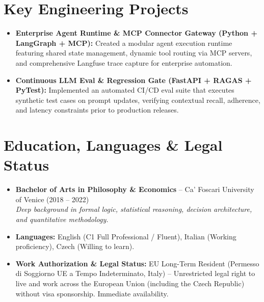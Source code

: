 \documentclass[a4paper,10pt]{article}
\begin{document}
\section{Key Engineering Projects}
\begin{itemize}
  \item \textbf{Enterprise Agent Runtime \& MCP Connector Gateway (Python + LangGraph + MCP):} Created a modular agent execution runtime featuring shared state management, dynamic tool routing via MCP servers, and comprehensive Langfuse trace capture for enterprise automation.
  \item \textbf{Continuous LLM Eval \& Regression Gate (FastAPI + RAGAS + PyTest):} Implemented an automated CI/CD eval suite that executes synthetic test cases on prompt updates, verifying contextual recall, adherence, and latency constraints prior to production releases.
\end{itemize}

\section{Education, Languages \& Legal Status}
\begin{itemize}
  \item \textbf{Bachelor of Arts in Philosophy \& Economics} -- Ca' Foscari University of Venice (2018 -- 2022) \\
  \textit{Deep background in formal logic, statistical reasoning, decision architecture, and quantitative methodology.}
  \item \textbf{Languages:} English (C1 Full Professional / Fluent), Italian (Working proficiency), Czech (Willing to learn).
  \item \textbf{Work Authorization \& Legal Status:} EU Long-Term Resident (Permesso di Soggiorno UE a Tempo Indeterminato, Italy) -- Unrestricted legal right to live and work across the European Union (including the Czech Republic) without visa sponsorship. Immediate availability.
\end{itemize}
\end{document}
